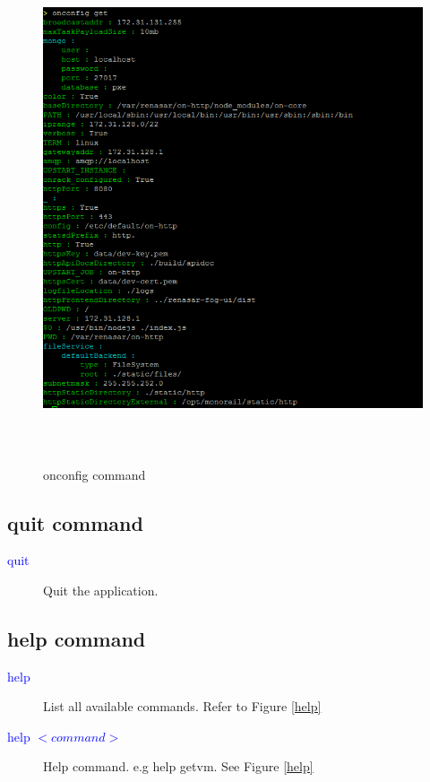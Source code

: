 \documentclass [12pt, a4paper, titlepage]{article}
\begin{document}
         \begin{figure}[H]
         \begin{center}
         \includegraphics[width=13cm,height=15cm]{png/onconfig}
         \end{center}
         \caption{onconfig command}
         \label{onconfig}
         \end{figure}



\subsection {quit command}
        \begin{description}
            \item[\textcolor{blue}{quit}] Quit the application.
        \end{description}

\subsection {help command}
        \begin{description}
            \item[\textcolor{blue}{help}] List all available commands. Refer to Figure \ref{help}
            \item[\textcolor{blue}{help $<command>$}] Help command. e.g help getvm. See Figure \ref{help}
        \end{description}
\end{document}
